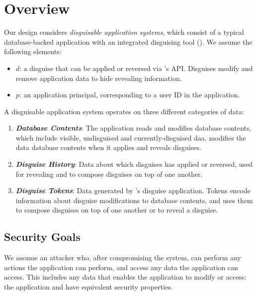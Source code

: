 \section{Overview}

Our design considers \emph{disguisable application systems}, which consist of a typical database-backed
application with an integrated disguising tool (\sys).
We assume the following elements:
\begin{itemize}
    \item $d$: a disguise that can be applied or reversed via \sys's API. Disguises modify and remove
    application data to hide revealing information. 
    \item $p$: an application principal, corresponding to a user ID in the application. 
\end{itemize}

\noindent
A disguisable application system operates on three different categories of data:
\begin{enumerate}
    \item \emph{\textbf{Database Contents}}: The application reads and modifies database
        contents, which include visible, undisguised and currently-disguised daa.
        \sys modifies the data database contents when it applies and reveals disguises.
    \item \emph{\textbf{Disguise History}}: Data about which disguises \sys has applied or
        reversed, used for revealing and to compose disguises on top of one another. 
    \item \emph{\textbf{Disguise Tokens}}: Data generated by \sys's
        disguise application. Tokens encode information about disguise modifications to database
        contents, and \sys uses them to compose disguises on top of one another or to reveal a
        disguise. 
\end{enumerate}

\subsection{Security Goals}
We assume an attacker who, after compromising the system, can perform any actions the
application can perform, and access any data the application can access. This includes any data that
\sys enables the application to modify or access: the application and \sys have equivalent security
properties.

